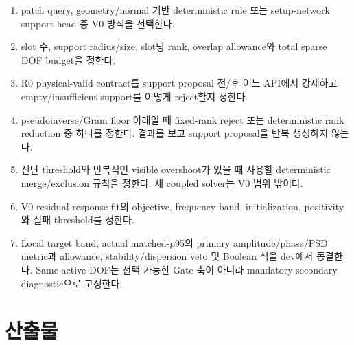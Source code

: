 \documentclass[10pt,a4paper]{article}
\begin{document}
\begin{enumerate}
  \item {} patch query, geometry/normal 기반 deterministic rule 또는
  setup-network support head 중 V0 방식을 선택한다.
  \item {} slot 수, support radius/size, slot당 rank, overlap allowance와
  total sparse DOF budget을 정한다.
  \item {} R0 physical-valid contract를 support proposal 전/후 어느 API에서
  강제하고 empty/insufficient support를 어떻게 reject할지 정한다.
  \item {} pseudoinverse/Gram floor 아래일 때 fixed-rank reject 또는
  deterministic rank reduction 중 하나를 정한다. 결과를 보고 support proposal을 반복 생성하지 않는다.
  \item {} 진단 threshold와 반복적인 visible overshoot가 있을 때 사용할
  deterministic merge/exclusion 규칙을 정한다. 새 coupled solver는 V0 범위 밖이다.
  \item {} V0 residual-response fit의 objective, frequency band,
  initialization, positivity와 실패 threshold를 정한다.
  \item {} Local target band, actual matched-p95의 primary
  amplitude/phase/PSD metric과 allowance, stability/dispersion veto 및 Boolean 식을 dev에서 동결한다.
  Same active-DOF는 선택 가능한 Gate 축이 아니라 mandatory secondary diagnostic으로 고정한다.
\end{enumerate}

\section{산출물}
\label{sec:r5-chapter-6}
\end{document}
